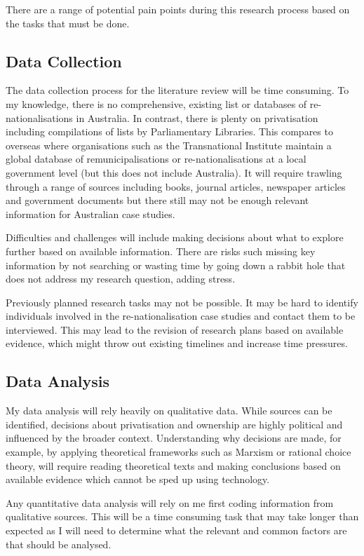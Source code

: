 \documentclass[a4paper]{article}
\begin{document}
There are a range of potential pain points during this research process based on the tasks that must be done. \par
\subsection*{Data Collection}
The data collection process for the literature review will be time consuming. To my knowledge, there is no comprehensive, existing list or databases of re-nationalisations in Australia. In contrast, there is plenty on privatisation including compilations of lists by Parliamentary Libraries. This compares to overseas where organisations such as the Transnational Institute maintain a global database of remunicipalisations or re-nationalisations at a local government level (but this does not include Australia). It will require trawling through a range of sources including books, journal articles, newspaper articles and government documents but there still may not be enough relevant information for Australian case studies.\par
Difficulties and challenges will include making decisions about what to explore further based on available information. There are risks such missing key information by not searching or wasting time by going down a rabbit hole that does not address my research question, adding stress.\par 
Previously planned research tasks may not be possible. It may be hard to identify individuals involved in the re-nationalisation case studies and contact them to be interviewed. This may lead to the revision of research plans based on available evidence, which might throw out existing timelines and increase time pressures.\par
\subsection*{Data Analysis}
My data analysis will rely heavily on qualitative data.  While sources can be identified, decisions about privatisation and ownership are highly political and influenced by the broader context. Understanding why decisions are made, for example, by applying theoretical frameworks such as Marxism or rational choice theory, will require reading theoretical texts and making conclusions based on available evidence which cannot be sped up using technology.\par
Any quantitative data analysis will rely on me first coding information from qualitative sources. This will be a time consuming task that may take longer than expected as I will need to determine what the relevant and common factors are that should be analysed. 
\end{document}
